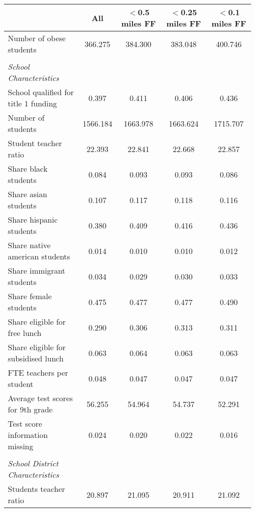 {
\def\sym#1{\ifmmode^{#1}\else\(^{#1}\)\fi}
\begin{tabular}{l*{4}{c}}
\hline\hline
                    &\multicolumn{1}{c}{All}&\multicolumn{1}{c}{$<$0.5 miles FF}&\multicolumn{1}{c}{$<$0.25 miles FF}&\multicolumn{1}{c}{$<$0.1 miles FF }\\
\hline
Number of obese students&     366.275&     384.300&     383.048&     400.746\\
\\ \textit{School Characteristics}&            &            &            &            \\
School qualified for title 1 funding&       0.397&       0.411&       0.406&       0.436\\
Number of students  &    1566.184&    1663.978&    1663.624&    1715.707\\
Student teacher ratio&      22.393&      22.841&      22.668&      22.857\\
Share black students&       0.084&       0.093&       0.093&       0.086\\
Share asian students&       0.107&       0.117&       0.118&       0.116\\
Share hispanic students&       0.380&       0.409&       0.416&       0.436\\
Share native american students&       0.014&       0.010&       0.010&       0.012\\
Share immigrant students&       0.034&       0.029&       0.030&       0.033\\
Share female students&       0.475&       0.477&       0.477&       0.490\\
Share eligible for free lunch&       0.290&       0.306&       0.313&       0.311\\
Share eligible for subsidised lunch&       0.063&       0.064&       0.063&       0.063\\
FTE teachers per student&       0.048&       0.047&       0.047&       0.047\\
Average test scores for 9th grade&      56.255&      54.964&      54.737&      52.291\\
Test score information missing&       0.024&       0.020&       0.022&       0.016\\
 \\  \textit{School District Characteristics}&            &            &            &            \\
Students teacher ratio&      20.897&      21.095&      20.911&      21.092\\

\end{tabular}}
